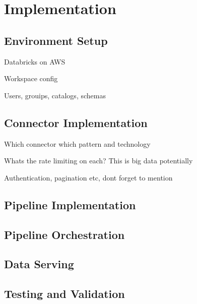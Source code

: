 \chapter{Implementation}
\label{ch:implementation}

\section{Environment Setup}

Databricks on AWS

Workspace config

Users, grouips, catalogs, schemas

\section{Connector Implementation}

Which connector which pattern and technology

Whats the rate limiting on each? This is big data potentially

Authentication, pagination etc, dont forget to mention

\section{Pipeline Implementation}

\section{Pipeline Orchestration}

\section{Data Serving}

\section{Testing and Validation}

